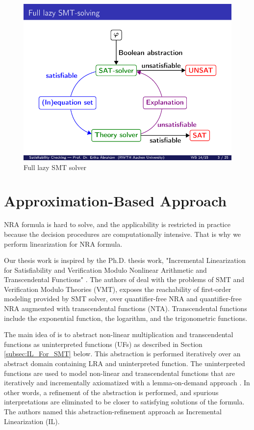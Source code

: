 \begin{figure}[ht!]
  \centering
  \includegraphics[width=0.7\linewidth]{./figures/FullLazySMT.pdf}
  \caption{Full lazy SMT solver \cite{brahm2010ALS}}
  \label{fig:FullLazySMT}
\end{figure}

\section{Approximation-Based Approach}
\label{sec:Approximation_Based_Approach}
NRA formula is hard to solve, and the applicability is restricted in practice because the decision procedures are computationally intensive.
That is why we perform linearization for NRA formula.\newline

\noindent Our thesis work is inspired by the Ph.D. thesis work, "Incremental Linearization for Satisfiability and Verification Modulo Nonlinear Arithmetic and Transcendental Functions" \cite{irfan2018incremental}.
The authors of \cite{Cimatti:2018:ILS:3274693.3230639} deal with the problems of SMT and Verification Modulo Theories (VMT), exposes the reachability of first-order modeling provided by SMT solver, over quantifier-free NRA and quantifier-free NRA augmented with transcendental functions (NTA).
Transcendental functions include the exponential function, the logarithm, and the trigonometric functions.\newline

\noindent The main idea of \cite{Cimatti:2018:ILS:3274693.3230639} is to abstract non-linear multiplication and transcendental functions as uninterpreted functions (UFs) as described in Section \ref{subsec:IL_For_SMT} below.
This abstraction is performed iteratively over an abstract domain containing LRA and uninterpreted function.
The uninterpreted functions are used to model non-linear and transcendental functions that are iteratively and incrementally axiomatized with a lemma-on-demand approach \cite{Cimatti:2018:ILS:3274693.3230639}.
In other words, a refinement of the abstraction is performed, and spurious interpretations are eliminated to be closer to satisfying solutions of the formula.
The authors named this abstraction-refinement approach as Incremental Linearization (IL).\newline

